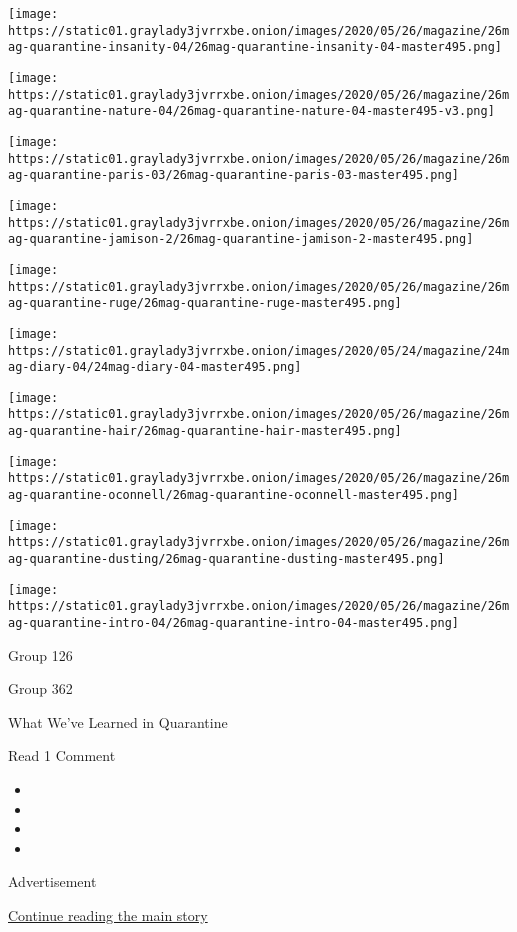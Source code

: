 \texttt{[image: https://static01.graylady3jvrrxbe.onion/images/2020/05/26/magazine/26mag-quarantine-insanity-04/26mag-quarantine-insanity-04-master495.png]}

\texttt{[image: https://static01.graylady3jvrrxbe.onion/images/2020/05/26/magazine/26mag-quarantine-nature-04/26mag-quarantine-nature-04-master495-v3.png]}

\texttt{[image: https://static01.graylady3jvrrxbe.onion/images/2020/05/26/magazine/26mag-quarantine-paris-03/26mag-quarantine-paris-03-master495.png]}

\texttt{[image: https://static01.graylady3jvrrxbe.onion/images/2020/05/26/magazine/26mag-quarantine-jamison-2/26mag-quarantine-jamison-2-master495.png]}

\texttt{[image: https://static01.graylady3jvrrxbe.onion/images/2020/05/26/magazine/26mag-quarantine-ruge/26mag-quarantine-ruge-master495.png]}

\texttt{[image: https://static01.graylady3jvrrxbe.onion/images/2020/05/24/magazine/24mag-diary-04/24mag-diary-04-master495.png]}

\texttt{[image: https://static01.graylady3jvrrxbe.onion/images/2020/05/26/magazine/26mag-quarantine-hair/26mag-quarantine-hair-master495.png]}

\texttt{[image: https://static01.graylady3jvrrxbe.onion/images/2020/05/26/magazine/26mag-quarantine-oconnell/26mag-quarantine-oconnell-master495.png]}

\texttt{[image: https://static01.graylady3jvrrxbe.onion/images/2020/05/26/magazine/26mag-quarantine-dusting/26mag-quarantine-dusting-master495.png]}

\texttt{[image: https://static01.graylady3jvrrxbe.onion/images/2020/05/26/magazine/26mag-quarantine-intro-04/26mag-quarantine-intro-04-master495.png]}

Group 126

Group 362

What We've Learned in Quarantine

Read 1 Comment

\begin{itemize}
\item
\item
\item
\item
\end{itemize}

Advertisement

\protect\hyperlink{after-bottom}{Continue reading the main story}

